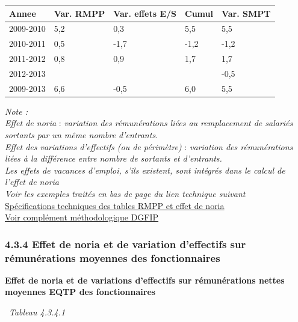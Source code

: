 \begin{longtable}[]{@{}lllll@{}}
\toprule
Annee & Var. RMPP & Var. effets E/S & Cumul & Var. SMPT\tabularnewline
\midrule
\endhead
2009-2010 & 5,2 & 0,3 & 5,5 & 5,5\tabularnewline
2010-2011 & 0,5 & -1,7 & -1,2 & -1,2\tabularnewline
2011-2012 & 0,8 & 0,9 & 1,7 & 1,7\tabularnewline
2012-2013 & & & & -0,5\tabularnewline
2009-2013 & 6,6 & -0,5 & 6,0 & 5,5\tabularnewline
\bottomrule
\end{longtable}

\emph{Note :}\\
\emph{Effet de noria} : \emph{variation des rémunérations liées au
remplacement de salariés sortants par un même nombre d'entrants.}\\
\emph{Effet des variations d'effectifs (ou de périmètre)} :
\emph{variation des rémunérations liées à la différence entre nombre de
sortants et d'entrants.}\\
\emph{Les effets de vacances d'emploi, s'ils existent, sont intégrés
dans le calcul de l'effet de noria}\\
\emph{Voir les exemples traités en bas de page du lien technique
suivant}\\
\href{../Docs/Notices/noria.html}{Spécifications techniques des tables RMPP
et effet de noria}\\
\href{../Docs/Notices/GVT\%20et\%20noria.pdf}{Voir complément
méthodologique DGFIP}

\hypertarget{effet-de-noria-et-de-variation-deffectifs-sur-remunerations-moyennes-des-fonctionnaires}{%
\subsubsection{4.3.4 Effet de noria et de variation d'effectifs sur
rémunérations moyennes des
fonctionnaires}\label{effet-de-noria-et-de-variation-deffectifs-sur-remunerations-moyennes-des-fonctionnaires}}

\textbf{Effet de noria et de variations d'effectifs sur rémunérations
nettes moyennes EQTP des fonctionnaires}

~\emph{Tableau 4.3.4.1}

